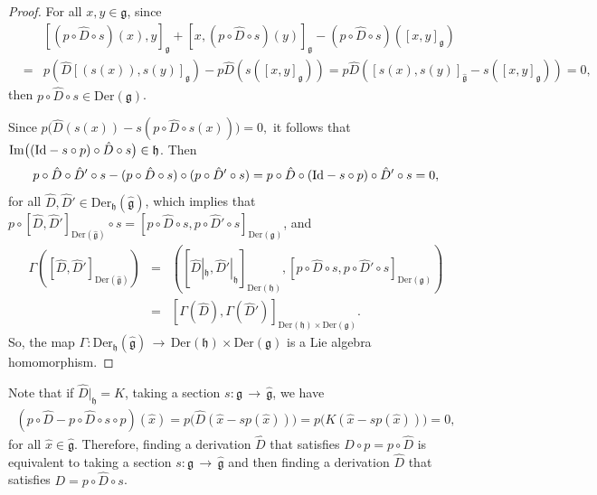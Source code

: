 \documentclass[12pt]{amsart}
\newcommand{\lon }{\,\rightarrow\,}
\newcommand{\g}{\mathfrak g}
\newcommand{\h}{\mathfrak h}
\newcommand{\Id}{{\rm{Id}}}
\newcommand{\Der}{\mathrm{Der}}
\begin{document}
\begin{proof}
For all $x, y\in\g$, since 
\begin{eqnarray*}
&&[(p\circ\hat{D}\circ s)(x),y]_{\g}+[x,(p\circ\hat{D}\circ s)(y)]_{\g}-(p\circ\hat{D}\circ s)([x,y]_{\g})\\
&=&p(\hat{D}[(s(x)),s(y)]_{\g})-p\hat{D}(s([x,y]_{\g}))=p\hat{D}([s(x),s(y)]_{\hat{\g}}-s([x,y]_{\g}))=0,
\end{eqnarray*}
then $p\circ \hat{D}\circ s\in\Der(\g)$. 

Since
$
   p\big( \hat{D}(s(x))-s(p\circ\hat{D}\circ s(x))\big)=0,%
$ it follows that $\mathrm{Im}\big((\Id-s\circ p)\circ\hat{D}\circ s\big)\in\h$. Then
\begin{equation*}
    p\circ\hat{D}\circ\hat{D}'\circ s-(p\circ\hat{D}\circ s)\circ (p\circ\hat{D}'\circ s)=p\circ\hat{D}\circ(\Id-s\circ p)\circ\hat{D}'\circ s=0,
\end{equation*}
for all $\hat{D},\hat{D}'\in\Der_{\h}(\hat{\g})$, which implies that
$
    p\circ[\hat{D},\hat{D}']_{\Der(\hat{\g})}\circ s %
    =[p\circ\hat{D}\circ s,p\circ\hat{D}'\circ s]_{\Der(\g)}$,
and 
\begin{eqnarray*}
    \Gamma([\hat{D},\hat{D}']_{\Der(\hat{\g})})%
    &=&([\hat{D}|_{\h},\hat{D}'|_{\h}]_{\Der(\h)},[p\circ\hat{D}\circ s,p\circ\hat{D}'\circ s]_{\Der(\g)})\\
    &=&[\Gamma(\hat{D}),\Gamma(\hat{D}')]_{\Der(\h)\times\Der(\g)}.
\end{eqnarray*} 
So, the map $\Gamma:\Der_{\h}(\hat{\g})\lon\Der(\h)\times\Der(\g)$ is a Lie algebra homomorphism.
\end{proof}
Note that if $\hat{D}|_\h=K$, taking a section $s:\g\lon\hat{\g}$, we have 
\begin{eqnarray*}
    (p\circ\hat{D}-p\circ\hat{D}\circ s\circ p)(\hat{x})=p\Big(\hat{D}(\hat{x}-sp(\hat{x}))\Big)=p\Big(K(\hat{x}-sp(\hat{x}))\Big)=0,
\end{eqnarray*}
for all $\hat{x}\in\hat{\g}$.
Therefore, finding a derivation $\hat{D}$ that satisfies $D\circ p=p\circ \hat{D}$ is equivalent to taking a section $s:\g\lon\hat{\g}$ and then finding a derivation $\hat{D}$ that satisfies $D=p\circ\hat{D}\circ s$. 
\end{document}
